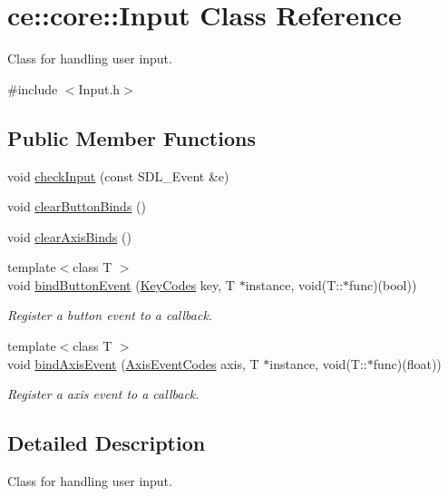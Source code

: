 \hypertarget{classce_1_1core_1_1_input}{}\section{ce\+:\+:core\+:\+:Input Class Reference}
\label{classce_1_1core_1_1_input}


Class for handling user input.  




{\ttfamily \#include $<$Input.\+h$>$}

\subsection*{Public Member Functions}
\begin{DoxyCompactItemize}
\item 
void \hyperlink{classce_1_1core_1_1_input_aa921d892488a1c346539aab31343ac0c}{check\+Input} (const S\+D\+L\+\_\+\+Event \&e)
\item 
void \hyperlink{classce_1_1core_1_1_input_a84f905f6bd9f450d26fd23e1f8868dcb}{clear\+Button\+Binds} ()
\item 
void \hyperlink{classce_1_1core_1_1_input_a945216b48170e96f34f99c00ebeb138a}{clear\+Axis\+Binds} ()
\item 
{\footnotesize template$<$class T $>$ }\\void \hyperlink{classce_1_1core_1_1_input_a97f7ebd9ae572b447631bd05a782b73b}{bind\+Button\+Event} (\hyperlink{_input_codes_8h_a0205e42a827583bec00e09861c1bd835}{Key\+Codes} key, T $\ast$instance, void(T\+::$\ast$func)(bool))
\begin{DoxyCompactList}\small\item\em Register a button event to a callback. \end{DoxyCompactList}\item 
{\footnotesize template$<$class T $>$ }\\void \hyperlink{classce_1_1core_1_1_input_abf2973ba66d676fa5c0c731913049555}{bind\+Axis\+Event} (\hyperlink{_input_codes_8h_a9044fffd6a7c3417b0a100f0a0427a90}{Axis\+Event\+Codes} axis, T $\ast$instance, void(T\+::$\ast$func)(float))
\begin{DoxyCompactList}\small\item\em Register a axis event to a callback. \end{DoxyCompactList}\end{DoxyCompactItemize}


\subsection{Detailed Description}
Class for handling user input. 

